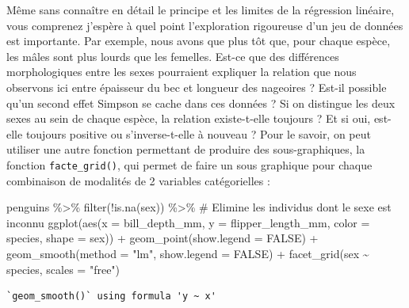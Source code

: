 \documentclass[
  letterpaper,
  DIV=11,
  numbers=noendperiod]{scrreprt}
\newenvironment{Shaded}{\begin{snugshade}}{\end{snugshade}}
\newcommand{\AttributeTok}[1]{\textcolor[rgb]{0.40,0.45,0.13}{#1}}
\newcommand{\CommentTok}[1]{\textcolor[rgb]{0.37,0.37,0.37}{#1}}
\newcommand{\ConstantTok}[1]{\textcolor[rgb]{0.56,0.35,0.01}{#1}}
\newcommand{\FunctionTok}[1]{\textcolor[rgb]{0.28,0.35,0.67}{#1}}
\newcommand{\NormalTok}[1]{\textcolor[rgb]{0.00,0.23,0.31}{#1}}
\newcommand{\SpecialCharTok}[1]{\textcolor[rgb]{0.37,0.37,0.37}{#1}}
\newcommand{\StringTok}[1]{\textcolor[rgb]{0.13,0.47,0.30}{#1}}
\begin{document}
Même sans connaître en détail le principe et les limites de la
régression linéaire, vous comprenez j'espère à quel point l'exploration
rigoureuse d'un jeu de données est importante. Par exemple, nous avons
que plus tôt que, pour chaque espèce, les mâles sont plus lourds que les
femelles. Est-ce que des différences morphologiques entre les sexes
pourraient expliquer la relation que nous observons ici entre épaisseur
du bec et longueur des nageoires ? Est-il possible qu'un second effet
Simpson se cache dans ces données ? Si on distingue les deux sexes au
sein de chaque espèce, la relation existe-t-elle toujours ? Et si oui,
est-elle toujours positive ou s'inverse-t-elle à nouveau ? Pour le
savoir, on peut utiliser une autre fonction permettant de produire des
sous-graphiques, la fonction \texttt{facte\_grid()}, qui permet de faire
un sous graphique pour chaque combinaison de modalités de 2 variables
catégorielles :

\begin{Shaded}
\begin{Highlighting}[]
\NormalTok{penguins }\SpecialCharTok{\%\textgreater{}\%} 
  \FunctionTok{filter}\NormalTok{(}\SpecialCharTok{!}\FunctionTok{is.na}\NormalTok{(sex)) }\SpecialCharTok{\%\textgreater{}\%}    \CommentTok{\# Elimine les individus dont le sexe est inconnu}
  \FunctionTok{ggplot}\NormalTok{(}\FunctionTok{aes}\NormalTok{(}\AttributeTok{x =}\NormalTok{ bill\_depth\_mm, }\AttributeTok{y =}\NormalTok{ flipper\_length\_mm,}
                     \AttributeTok{color =}\NormalTok{ species, }\AttributeTok{shape =}\NormalTok{ sex)) }\SpecialCharTok{+}
  \FunctionTok{geom\_point}\NormalTok{(}\AttributeTok{show.legend =} \ConstantTok{FALSE}\NormalTok{) }\SpecialCharTok{+}
  \FunctionTok{geom\_smooth}\NormalTok{(}\AttributeTok{method =} \StringTok{"lm"}\NormalTok{, }\AttributeTok{show.legend =} \ConstantTok{FALSE}\NormalTok{) }\SpecialCharTok{+}
  \FunctionTok{facet\_grid}\NormalTok{(sex }\SpecialCharTok{\textasciitilde{}}\NormalTok{ species, }\AttributeTok{scales =} \StringTok{"free"}\NormalTok{)}
\end{Highlighting}
\end{Shaded}

\begin{verbatim}
`geom_smooth()` using formula 'y ~ x'
\end{verbatim}
\end{document}
